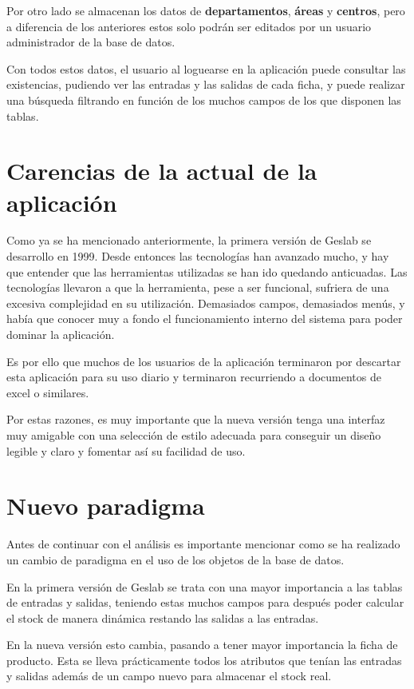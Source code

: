 Por otro lado se almacenan los datos de \textbf{departamentos}, \textbf{áreas} y \textbf{centros}, pero a diferencia de los anteriores estos solo podrán ser editados por un usuario administrador de la base de datos.

Con todos estos datos, el usuario al loguearse en la aplicación puede consultar las existencias, pudiendo ver las entradas y las salidas de cada ficha, y puede realizar una búsqueda filtrando en función de los muchos campos de los que disponen las tablas.


\section{Carencias de la actual de la aplicación}

Como ya se ha mencionado anteriormente, la primera versión de Geslab se desarrollo en 1999. Desde entonces las tecnologías han avanzado mucho, y hay que entender que las herramientas utilizadas se han ido quedando anticuadas. Las tecnologías llevaron a que la herramienta, pese a ser funcional, sufriera de una excesiva complejidad en su utilización. Demasiados campos, demasiados menús, y había que conocer muy a fondo el funcionamiento interno del sistema para poder dominar la aplicación.

Es por ello que muchos de los usuarios de la aplicación terminaron por descartar esta aplicación para su uso diario y terminaron recurriendo a documentos de excel o similares.

Por estas razones, es muy importante que la nueva versión tenga una interfaz muy amigable con una selección de estilo adecuada para conseguir un diseño legible y claro y fomentar así su facilidad de uso.


\section{Nuevo paradigma}

Antes de continuar con el análisis es importante mencionar como se ha realizado un cambio de paradigma en el uso de los objetos de la base de datos.

En la primera versión de Geslab se trata con una mayor importancia a las tablas de entradas y salidas, teniendo estas muchos campos para después poder calcular el stock de manera dinámica restando las salidas a las entradas. 

En la nueva versión esto cambia, pasando a tener mayor importancia la ficha de producto. Esta se lleva prácticamente todos los atributos que tenían las entradas y salidas además de un campo nuevo para almacenar el stock real.

